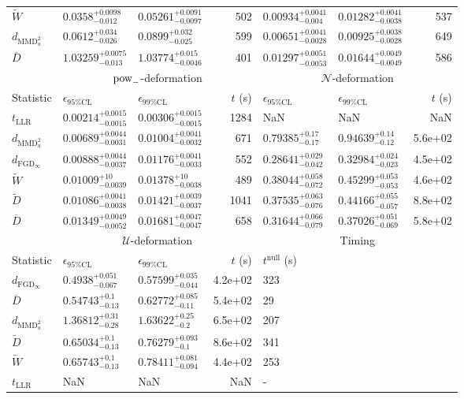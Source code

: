 \begin{tabular}{l|llr|llr}
	$\widetilde{W}$ & $0.0358_{-0.012}^{+0.0098}$ & $0.05261_{-0.0097}^{+0.0091}$ & 502 & $0.00934_{-0.004}^{+0.0041}$ & $0.01282_{-0.0038}^{+0.0041}$ & 537 \\
	$d_{\mathrm{MMD}^{2}_{u}}$ & $0.0612_{-0.026}^{+0.034}$ & $0.0899_{-0.025}^{+0.032}$ & 599 & $0.00651_{-0.0028}^{+0.0041}$ & $0.00925_{-0.0028}^{+0.0038}$ & 649 \\
	$\overline{D}$ & $1.03259_{-0.013}^{+0.0075}$ & $1.03774_{-0.0046}^{+0.015}$ & 401 & $0.01297_{-0.0053}^{+0.0051}$ & $0.01644_{-0.0049}^{+0.0049}$ & 586 \\
	\toprule
	\multicolumn{1}{c}{} & \multicolumn{3}{c}{$\rm{pow}_{-}$-deformation} & \multicolumn{3}{c}{$\mathcal{N}$-deformation} \\
	Statistic & $\epsilon_{95\%\mathrm{CL}}$ & $\epsilon_{99\%\mathrm{CL}}$ & $t$ (s) & $\epsilon_{95\%\mathrm{CL}}$ & $\epsilon_{99\%\mathrm{CL}}$ & $t$ (s) \\
	\midrule
	$t_{\mathrm{LLR}}$ & $0.00214_{-0.0015}^{+0.0015}$ & $0.00306_{-0.0015}^{+0.0015}$ & 1284 & NaN & NaN & NaN \\
	$d_{\mathrm{MMD}^{2}_{u}}$ & $0.00689_{-0.0031}^{+0.0044}$ & $0.01004_{-0.0032}^{+0.0041}$ & 671 & $0.79385_{-0.17}^{+0.17}$ & $0.94639_{-0.12}^{+0.14}$ & 5.6e+02 \\
	$d_{\mathrm{FGD}_{\infty}}$ & $0.00888_{-0.0037}^{+0.0044}$ & $0.01176_{-0.0033}^{+0.0041}$ & 552 & $0.28641_{-0.042}^{+0.029}$ & $0.32984_{-0.023}^{+0.024}$ & 4.5e+02 \\
	$\widetilde{W}$ & $0.01009_{-0.0039}^{+10}$ & $0.01378_{-0.0038}^{+10}$ & 489 & $0.38044_{-0.072}^{+0.058}$ & $0.45299_{-0.053}^{+0.053}$ & 4.6e+02 \\
	$\widetilde{D}$ & $0.01086_{-0.0038}^{+0.0041}$ & $0.01421_{-0.0037}^{+0.0039}$ & 1041 & $0.37535_{-0.076}^{+0.063}$ & $0.44166_{-0.057}^{+0.055}$ & 8.8e+02 \\
	$\overline{D}$ & $0.01349_{-0.0052}^{+0.0049}$ & $0.01681_{-0.0047}^{+0.0047}$ & 658 & $0.31644_{-0.079}^{+0.066}$ & $0.37026_{-0.069}^{+0.051}$ & 5.8e+02 \\
	\toprule
	\multicolumn{1}{c}{} & \multicolumn{3}{c}{$\mathcal{U}$-deformation} & \multicolumn{3}{c}{Timing} \\
	Statistic & $\epsilon_{95\%\mathrm{CL}}$ & $\epsilon_{99\%\mathrm{CL}}$ & $t$ (s) & $t^{\mathrm{null}}$ (s) \\
	\midrule
	$d_{\mathrm{FGD}_{\infty}}$ & $0.4938_{-0.067}^{+0.051}$ & $0.57599_{-0.044}^{+0.035}$ & 4.2e+02 & 323 \\
	$\overline{D}$ & $0.54743_{-0.13}^{+0.1}$ & $0.62772_{-0.11}^{+0.085}$ & 5.4e+02 & 29 \\
	$d_{\mathrm{MMD}^{2}_{u}}$ & $1.36812_{-0.28}^{+0.31}$ & $1.63622_{-0.2}^{+0.25}$ & 6.5e+02 & 207 \\
	$\widetilde{D}$ & $0.65034_{-0.13}^{+0.1}$ & $0.76279_{-0.1}^{+0.093}$ & 8.6e+02 & 341 \\
	$\widetilde{W}$ & $0.65743_{-0.13}^{+0.1}$ & $0.78411_{-0.094}^{+0.081}$ & 4.4e+02 & 253 \\
	$t_{\mathrm{LLR}}$ & NaN & NaN & NaN & - \\
	\bottomrule
\end{tabular}